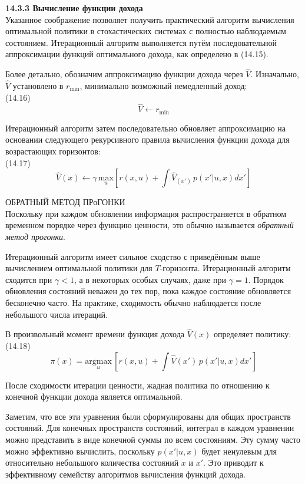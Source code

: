 \documentclass[10pt,a4paper]{article}
\begin{document}
\textbf{14.3.3	Вычисление функции дохода}\\

Указанное соображение позволяет получить практический алгоритм вычисления оптимальной политики в стохастических системах с полностью наблюдаемым состоянием. Итерационный алгоритм выполняется путём последовательной аппроксимации функций оптимального дохода, как определено в (14.15).

Более детально, обозначим аппроксимацию функции дохода через $\hat{V}$. Изначально, $\hat{V}$ установлено в $r_{\min}$, минимально возможный немедленный доход:\\

(14.16)
$$\hat{V}\longleftarrow r_{\min}$$

Итерационный алгоритм затем последовательно обновляет аппроксимацию на основании следующего рекурсивного правила вычисления функции дохода для возрастающих горизонтов:\\

(14.17) 
$$\hat{V}(x)\longleftarrow\gamma\,\underset{u}{\text{max}}\left[r(x,u)+\int \hat{V}_(x')\,p(x'|u,x)dx' \right]$$

ОБРАТНЫЙ МЕТОД ПРоГОНКИ\\

Поскольку при каждом обновлении информация распространяется в обратном временном порядке через функцию ценности, это обычно называется \textit{обратный метод прогонки}.

Итерационный алгоритм имеет сильное сходство с приведённым выше вычислением оптимальной политики для $T$-горизонта. Итерационный алгоритм сходится при $\gamma<1$, а в некоторых особых случаях, даже при $\gamma = 1$. Порядок обновления состояний неважен до тех пор, пока каждое состояние обновляется бесконечно часто. На практике, сходимость обычно наблюдается после небольшого числа итераций.

В произвольный момент времени функция дохода $\hat{V}(x)$ определяет политику:\\

(14.18)
$$\pi(x)=\underset{u}{\text{argmax}}\,\left[r(x,u)+\int \hat{V}(x')\,p(x'|u,x)dx'\right]$$

После сходимости итерации ценности, жадная политика по отношению к конечной функции дохода является оптимальной.

Заметим, что все эти уравнения были сформулированы для общих пространств состояний. Для конечных пространств состояний, интеграл в каждом уравнении можно представить в виде конечной суммы по всем состояниям. Эту сумму часто можно эффективно вычислить, поскольку $p(x'|u, x)$ будет ненулевым для относительно небольшого количества состояний $x$ и $x'$. Это приводит к эффективному семейству алгоритмов вычисления функций дохода.
\end{document}
